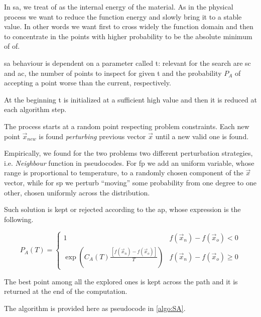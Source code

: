 \documentclass[journal]{IEEEtran}
\begin{document}
In \gls{sa}, we treat \gls{of} as the internal energy of the material.
As in the physical process we want to reduce the function energy and slowly bring it to a stable value. In other words we want first to cross widely the function domain and then to concentrate in the points with higher probability to be the absolute minimum of \gls{of}.

\gls{sa} behaviour is dependent on a parameter called \gls{t}: relevant for the search are \gls{sc} and \gls{ac}, the number of points to inspect for given \gls{t} and the probability $P_A$ of accepting a point worse than the current, respectively.

At the beginning \gls{t} is initialized at a sufficient high value and then it is reduced at each algorithm step.

The process starts at a random point respecting problem constraints. Each new point $\vec{x}_{new}$ is found \emph{perturbing} previous vector $\vec{x}$ until a new valid one is found.

Empirically, we found for the two problems two different perturbation strategies, i.e. \emph{Neighbour} function in pseudocodes.
For \gls{fp} we add an uniform variable, whose range is proportional to temperature, to a randomly chosen component of the $\vec{x}$ vector, while for \gls{sp} we perturb ``moving'' some probability from one degree to one other, chosen uniformly across the distribution.

Such solution is kept or rejected according to the \gls{ap}, whose expression is the following.

 \begin{equation*} \label{accept_prob}
	P_A(T) = \begin{cases}
		1 & f(\vec{x}_n)-f (\vec{x}_o) < 0 \\
		\exp{ \left( C_A(T) \frac{
					\, [f(\vec{x}_n) - f(\vec{x}_o)] }{T} \right) }
		& f (\vec{x}_n)-f(\vec{x}_o) \geq 0
  \end{cases}
 \end{equation*}

The best point among all the explored ones is kept across the path and it is returned at the end of the computation.

The algorithm is provided here as pseudocode in \autoref{algo:SA}.
\end{document}
